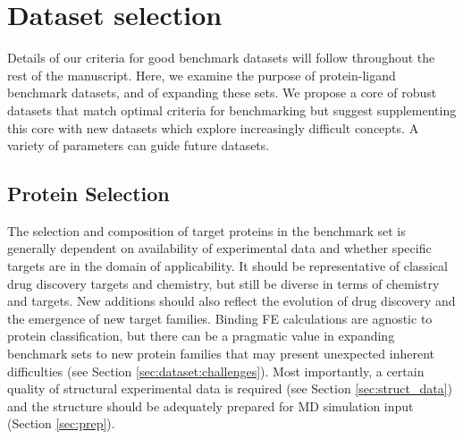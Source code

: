 \documentclass[9pt,bestpractices]{livecoms}
\begin{document}
\section{Dataset selection}
\label{sec:dataset}

Details of our criteria for good benchmark datasets will follow throughout the rest of the manuscript. Here, we examine the purpose of protein-ligand benchmark datasets, and of expanding these sets.
We propose a core of robust datasets that match optimal criteria for benchmarking but suggest supplementing this core with new datasets which explore increasingly difficult concepts. A variety of parameters can guide future datasets.

\subsection{Protein Selection}
\label{sec:dataset:proteins}
The selection and composition of target proteins in the benchmark set is generally dependent
on availability of experimental data and whether specific targets are in the domain of applicability.
%
It should be representative of classical drug discovery targets and chemistry, but still be diverse in terms of chemistry and targets. New additions should also reflect the evolution of drug discovery and the emergence of new target families.
Binding FE calculations are agnostic to protein classification, but there can be a pragmatic value in
expanding benchmark sets to new protein families that may present unexpected inherent difficulties (see Section \ref{sec:dataset:challenges}).
%
Most importantly, a certain quality of structural experimental data is required (see Section \ref{sec:struct_data})
and the structure should be adequately prepared for MD simulation input (Section \ref{sec:prep}).

\end{document}
